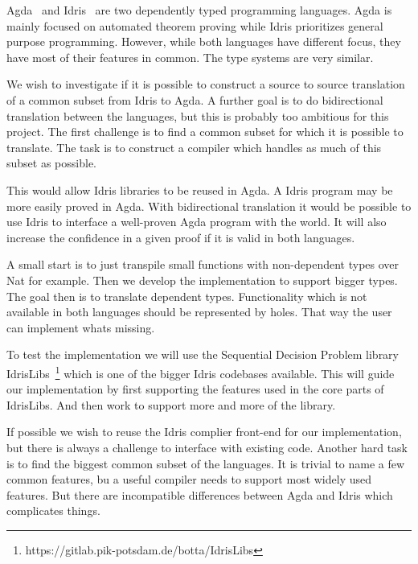 \documentclass{scrartcl}
\begin{document}

Agda~\cite{agda} and Idris~\cite{idris} are two dependently typed programming
languages.  Agda is mainly focused on automated theorem proving while Idris
prioritizes general purpose programming.  However, while both languages have
different focus, they have most of their features in common. The type systems
are very similar.

We wish to investigate if it is possible to construct a source to source
translation of a common subset from Idris to Agda.  A further goal is to do
bidirectional translation between the languages, but this is probably too
ambitious for this project.  The first challenge is to find a common subset for
which it is possible to translate. The task is to construct a compiler which
handles as much of this subset as possible.



This would allow Idris libraries to be reused in Agda. A Idris program may be
more easily proved in Agda. With bidirectional translation it would be possible
to use Idris to interface a well-proven Agda program with the world.  It will
also increase the confidence in a given proof if it is valid in both languages.

A small start is to just transpile small functions with non-dependent types
over Nat for example. Then we develop the implementation to support bigger
types. The goal then is to translate dependent types.  Functionality which is
not available in both languages should be represented by holes. That way the
user can implement whats missing.

To test the implementation we will use the Sequential Decision Problem library
IdrisLibs~\footnote{https://gitlab.pik-potsdam.de/botta/IdrisLibs} which is one
of the bigger Idris codebases available. This will guide our implementation by
first supporting the features used in the core parts of IdrisLibs. And then
work to support more and more of the library.

If possible we wish to reuse the Idris complier front-end for our
implementation, but there is always a challenge to interface with existing
code.  Another hard task is to find the biggest common subset of the languages.
It is trivial to name a few common features, bu a useful compiler needs to
support most widely used features. But there are incompatible differences
between Agda and Idris which complicates things.
\end{document}
